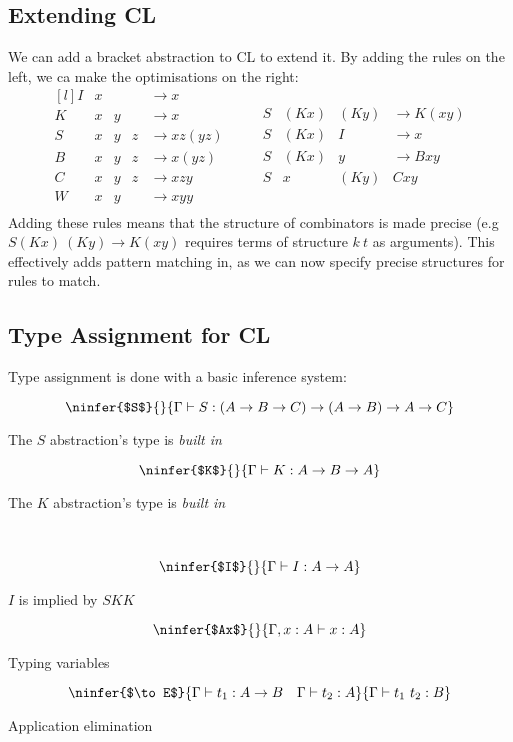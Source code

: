 \subsection{Extending CL}
We can add a bracket abstraction to CL to extend it.
By adding the rules on the left, we ca make the optimisations on the right:
\[\begin{matrix*}[l]
    I & x &   &   & \to x \\
    K & x & y &   & \to x \\
    S & x & y & z & \to xz(yz) \\
    B & x & y & z & \to x(yz) \\
    C & x & y & z & \to x z y \\
    W & x & y &   & \to x y y \\
\end{matrix*} \qquad \begin{matrix}
    S & (K x) & (K y) & \to K(xy) \\
    S & (K x) & I     & \to x \\
    S & (K x) & y     & \to B x y \\
    S & x     & (K y) & C x y \\
\end{matrix}\]
Adding these rules means that the structure of combinators is made precise (e.g $S (K x) \ (K y) \to K (x y)$ requires terms of structure $k \ t$ as arguments). This effectively adds pattern matching in, as we can now specify precise structures for rules to match.

\subsection{Type Assignment for CL}
Type assignment is done with a basic inference system:
\\ \begin{minipage}[b]{.5\textwidth}
    \[\ninfer{$S$}{}{\Gamma \vdash S: (A \to B \to C) \to (A \to B) \to A \to C}\]
    \centerline{The $S$ abstraction's type is \textit{built in}}
\end{minipage}
\begin{minipage}[b]{.5\textwidth}
    \[\ninfer{$K$}{}{\Gamma \vdash K : A \to B \to A}\]
    \centerline{The $K$ abstraction's type is \textit{built in}}
\end{minipage}
\\
\begin{minipage}[b]{.33\textwidth}
    \[\ninfer{$I$}{}{\Gamma \vdash I : A \to A}\]
    \centerline{$I$ is implied by $SKK$}
\end{minipage}
\begin{minipage}[b]{.33\textwidth}
    \[\ninfer{$Ax$}{}{\Gamma, x:A \vdash x : A}\]
    \centerline{Typing variables}
\end{minipage}
\begin{minipage}[b]{.33\textwidth}
    \[\ninfer{$\to E$}{\Gamma \vdash t_1 : A \to B \quad \Gamma \vdash t_2 : A}{\Gamma \vdash t_1 \ t_2 : B}\]
    \centerline{Application elimination}
\end{minipage}

